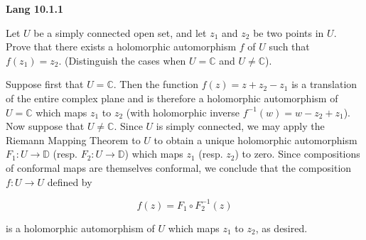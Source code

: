 \textbf{Lang 10.1.1}

Let $U$ be a simply connected open set, and let $z_1$ and $z_2$ be two points in $U$. Prove that there exists a 
holomorphic automorphism $f$ of $U$ such that $f(z_1) = z_2$. (Distinguish the cases when $U = \mathbb{C}$ and 
$U \neq \mathbb{C}$).

\begin{solution}
  Suppose first that $U = \mathbb{C}$. Then the function $f(z) = z + z_2 - z_1$ is a translation of the entire complex 
  plane and is therefore a holomorphic automorphism of $U = \mathbb{C}$ which maps $z_1$ to $z_2$ (with holomorphic 
  inverse $f^{-1}(w) = w - z_2 + z_1$). Now suppose that $U \neq \mathbb{C}$. Since $U$ is simply connected, we may
  apply the Riemann Mapping Theorem to $U$ to obtain a unique holomorphic automorphism $F_1: U \to \mathbb{D}$ (resp. 
  $F_2: U \to \mathbb{D}$) which maps $z_1$ (resp. $z_2$) to zero. Since compositions of conformal maps are themselves
  conformal, we conclude that the composition $f: U \to U$ defined by

  $$
  f(z) = F_1 \circ F_2^{-1} (z)
  $$
   
  is a holomorphic automorphism of $U$ which maps $z_1$ to $z_2$, as desired.
  \ \\
\end{solution}
